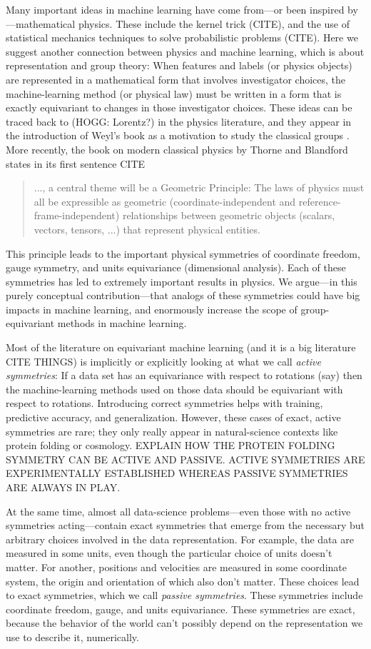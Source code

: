 \documentclass{article}
\theoremstyle{plain}
\theoremstyle{definition}
\theoremstyle{remark}
\begin{document}
Many important ideas in machine learning have come from---or been inspired by---mathematical physics.
These include the kernel trick (CITE), and the use of statistical mechanics techniques to solve probabilistic problems (CITE).
Here we suggest another connection between physics and machine learning, which is about representation and group theory:
When features and labels (or physics objects) are represented in a mathematical form that involves investigator choices, the machine-learning method (or physical law) must be written in a form that is exactly equivariant to changes in those investigator choices.
These ideas can be traced back to (HOGG: Lorentz?) in the physics literature, and they appear in the introduction of Weyl's book as a motivation to study the classical groups \cite{weyl}. More recently, the book on modern classical physics by Thorne and Blandford states in its first sentence CITE 
\begin{quote}
..., a central theme will be a Geometric Principle: The laws of physics must all
be expressible as geometric (coordinate-independent and reference-frame-independent)
relationships between geometric objects (scalars, vectors, tensors, ...) that represent
physical entities.
\end{quote}
This principle leads to the important physical symmetries of coordinate freedom, gauge symmetry, and units equivariance (dimensional analysis).
Each of these symmetries has led to extremely important results in physics.
We argue---in this purely conceptual contribution---that analogs of these symmetries could have big impacts in machine learning, and enormously increase the scope of group-equivariant methods in machine learning.
 
Most of the literature on equivariant machine learning (and it is a big literature CITE THINGS) is implicitly or explicitly looking at what we call \emph{active symmetries}:
If a data set has an equivariance with respect to rotations (say) then the machine-learning methods used on those data should be equivariant with respect to rotations.
Introducing correct symmetries helps with training, predictive accuracy, and generalization.
However, these cases of exact, active symmetries are rare; they only really appear in natural-science contexts like protein folding or cosmology. EXPLAIN HOW THE PROTEIN FOLDING SYMMETRY CAN BE ACTIVE AND PASSIVE. ACTIVE SYMMETRIES ARE EXPERIMENTALLY ESTABLISHED WHEREAS PASSIVE SYMMETRIES ARE ALWAYS IN PLAY. 

At the same time, almost all data-science problems---even those with no active symmetries acting---contain exact symmetries that emerge from the necessary but arbitrary choices involved in the data representation.
For example, the data are measured in some units, even though the particular choice of units doesn't matter.
For another, positions and velocities are measured in some coordinate system, the origin and orientation of which also don't matter.
These choices lead to exact symmetries, which we call \emph{passive symmetries}.
These symmetries include coordinate freedom, gauge, and units equivariance.
These symmetries are exact, because the behavior of the world can't possibly depend on the representation we use to describe it, numerically.
\end{document}

